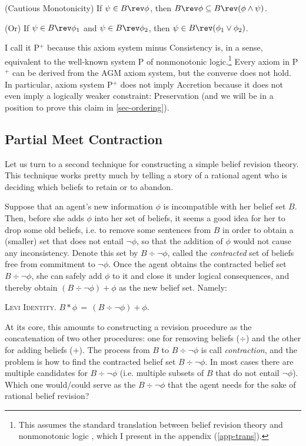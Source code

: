	\xm (Cautious Monotonicity) If $\psi \in B \rev \phi$, then $B \rev \phi \subseteq B \rev (\phi \wedge \psi)$.

	\xm (Or) If $\psi \in B \rev \phi_1$ and $\psi \in B \rev \phi_2$, then $\psi \in B \rev (\phi_1 \vee \phi_2)$.

\ed I call it P$^{+}$ because this axiom system minus Consistency is, in a sense, equivalent to the well-known system P of nonmonotonic logic.\footnote
	{
	This assumes the standard translation between belief revision theory and nonmonotonic logic \citep*{makinson1991relations}, which I present in the appendix (\autoref{app-trans}).
	}
Every axiom in P$^+$ can be derived from the AGM axiom system, but the converse does not hold. In particular, axiom system P$^+$ does not imply Accretion because it does not even imply a logically weaker constraint: Preservation (and we will be in a position to prove this claim in \autoref{sec-ordering}).

\subsection{Partial Meet Contraction}\label{sec-contraction}

Let us turn to a second technique for constructing a simple belief revision theory. This technique works pretty much by telling a story of a rational agent who is deciding which beliefs to retain or to abandon. 

Suppose that an agent's new information $\phi$ is incompatible with her belief set $B$. Then, before she adds $\phi$ into her set of beliefs, it seems a good idea for her to drop some old beliefs, i.e. to remove some sentences from $B$ in order to obtain a (smaller) set that does not entail $\neg\phi$, so that the addition of $\phi$ would not cause any inconsistency. Denote this set by $B \div \neg\phi$, called the {\em contracted} set of beliefs free from commitment to $\neg \phi$. Once the agent obtains the contracted belief set $B \div \neg\phi$, she can safely add $\phi$ to it and close it under logical consequences, and thereby obtain $(B \div \neg\phi) + \phi$ as the new belief set. Namely:\op

	\xm \textsc{Levi Identity.} $B * \phi \,=\, (B \div \neg\phi) + \phi$. 

\ed At its core, this amounts to constructing a revision procedure as the concatenation of two other procedures: one for removing beliefs ($\div$) and the other for adding beliefs ($+$).  The process from $B$ to $B \div \neg\phi$ is call {\em contraction}, and the problem is how to find the contracted belief set $B \div \neg\phi$. In most cases there are multiple candidates for $B \div \neg\phi$ (i.e. multiple subsets of $B$ that do not entail $\neg\phi$). Which one would/could serve as the $B \div \neg\phi$ that the agent needs for the sake of rational belief revision? 


